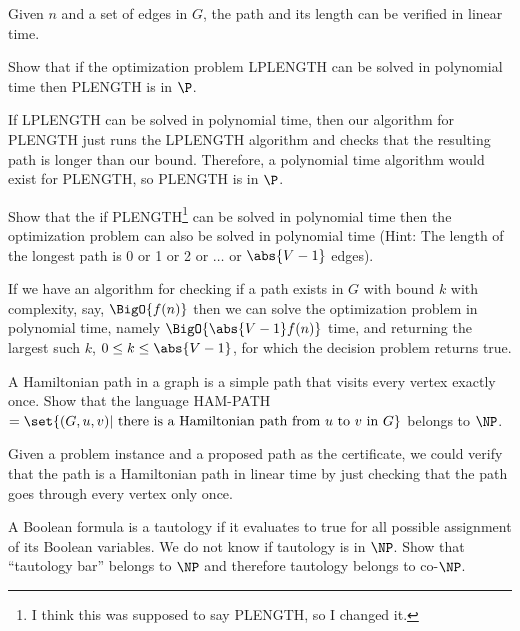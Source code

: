 \documentclass[12pt,letterpaper,twoside]{hmcpset}
\begin{document}
\begin{solution}
 Given \(n\) and a set of edges in \(G\), the path and its length can be verified in linear time.
\end{solution}

\begin{problem}[2c]
 Show that if the optimization problem LPLENGTH can be solved in polynomial time then PLENGTH is in $\P$.
\end{problem}

\begin{solution}
 If LPLENGTH can be solved in polynomial time, then our algorithm for PLENGTH just runs the LPLENGTH algorithm and checks that the resulting path is longer than our bound.  Therefore, a polynomial time algorithm would exist for PLENGTH, so PLENGTH is in \(\P\).
\end{solution}

\begin{problem}[2d]
 Show that the if PLENGTH\footnote{I think this was supposed to say PLENGTH, so I changed it.} can be solved in polynomial time then the optimization problem can also be solved in polynomial time (Hint: The length of the longest path is 0 or 1 or 2 or $\dotsc$ or $\abs{V-1}$ edges). 
\end{problem}

\begin{solution}
 If we have an algorithm for checking if a path exists in $G$ with bound $k$ with complexity, say, $\BigO{f(n)}$ then we can solve the optimization problem in polynomial time, namely $\BigO{\abs{V-1}f(n)}$ time, and returning the largest such $k$, $0 \leq k \leq \abs{V-1}$, for which the decision problem returns true.
\end{solution}

\begin{problem}[3]
 A Hamiltonian path in a graph is a simple path that visits every vertex exactly once. Show that the language HAM-PATH $= \set{(G,u,v)|\text{ there is a Hamiltonian path from } u \text{ to } v \text{ in } G}$ belongs to $\NP$.
\end{problem}

\begin{solution}
 Given a problem instance and a proposed path as the certificate, we could verify that the path is a Hamiltonian path in linear time by just checking that the path goes through every vertex only once.
\end{solution}

\begin{problem}[4]
 A Boolean formula is a tautology if it evaluates to true for all possible assignment of its Boolean variables.  We do not know if tautology is in $\NP$.  Show that ``tautology bar'' belongs to $\NP$ and therefore tautology belongs to co-$\NP$. 
\end{problem}
\end{document}
